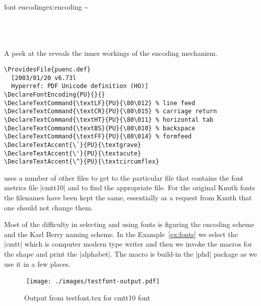 \begin{texexample}{font encoding}{ex:encoding}
\meaning\textasciitilde\\
\meaning\"\\
\meaning\NG\\
\meaning\k\\
\meaning\alpha
\meaning\printfontparams

\printfontparams
\end{texexample}

A peek at the  reveals the inner workings
of the encoding mechanism.

\begin{verbatim}
\ProvidesFile{puenc.def}
  [2003/01/20 v6.73l
  Hyperref: PDF Unicode definition (HO)]
\DeclareFontEncoding{PU}{}{}
\DeclareTextCommand{\textLF}{PU}{\80\012} % line feed
\DeclareTextCommand{\textCR}{PU}{\80\015} % carriage return
\DeclareTextCommand{\textHT}{PU}{\80\011} % horizontal tab
\DeclareTextCommand{\textBS}{PU}{\80\010} % backspace
\DeclareTextCommand{\textFF}{PU}{\80\014} % formfeed
\DeclareTextAccent{\`}{PU}{\textgrave}
\DeclareTextAccent{\'}{PU}{\textacute}
\DeclareTextAccent{\^}{PU}{\textcircumflex}
\end{verbatim}

\printfontparams 


\latex uses a number of other files to get to the particular file that contains the font metrics file |cmtt10| and to find the appropriate file. For the original Knuth fonts the filenames have been kept the same, essentially as a request from Knuth that one should not change them.

Most of the difficulty in selecting and using fonts is figuring the encoding scheme and the Karl Berry naming scheme. In the Example~\ref{ex:fonts} we select the  |cmtt| which is computer modern type writer and then we invoke the macros for the shape  and print the |alphabet|. The macro \cmd{\alphabet} is build-in the |phd| package as we use it in a few places.

\begin{figure}[htbp]
\centering

^^A\hspace*{-2cm}\texttt{[image: ./images/testfont-output.pdf]}

\caption{Output from testfont.tex for cmtt10 font}
\label{fig:fonttest}
\end{figure}



